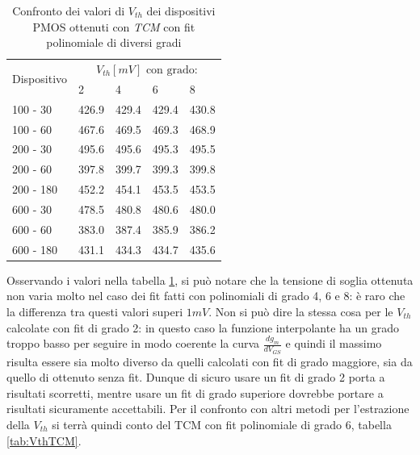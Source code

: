 \documentclass[12pt, letterpaper]{book}
\begin{document}
\begin{table}[h]
  \renewcommand{\arraystretch}{1.3}
  \centering
  \begin{tabular}{m{2cm} m{2cm} m{2cm} m{2cm} m{2cm}}
    \toprule
    \multirow{2}{*}{Dispositivo} & \multicolumn{4}{c}{$V_{th} [mV] \text{ con grado:}$}                         \\
    \cmidrule{2-5}
                                 & 2                                                    & 4     & 6     & 8     \\
    \midrule
    100 - 30                     & 426.9                                                & 429.4 & 429.4 & 430.8 \\
    \hline
    100 - 60                     & 467.6                                                & 469.5 & 469.3 & 468.9 \\
    \hline
    200 - 30                     & 495.6                                                & 495.6 & 495.3 & 495.5 \\
    \hline
    200 - 60                     & 397.8                                                & 399.7 & 399.3 & 399.8 \\
    \hline
    200 - 180                    & 452.2                                                & 454.1 & 453.5 & 453.5 \\
    \hline
    600 - 30                     & 478.5                                                & 480.8 & 480.6 & 480.0 \\
    \hline
    600 - 60                     & 383.0                                                & 387.4 & 385.9 & 386.2 \\
    \hline
    600 - 180                    & 431.1                                                & 434.3 & 434.7 & 435.6 \\
    \bottomrule
  \end{tabular}
  \caption{Confronto dei valori di $V_{th}$ dei dispositivi PMOS ottenuti con \emph{TCM} con fit polinomiale di diversi gradi}
  \label{tab:GradiTCM}
\end{table}

Osservando i valori nella tabella \ref{tab:GradiTCM}, si può notare che la tensione di soglia ottenuta non varia molto nel caso dei fit fatti con polinomiali di grado 4, 6 e 8: è raro che la differenza tra questi valori superi $1 mV$. Non si può dire la stessa cosa per le $V_{th}$ calcolate con fit di grado 2: in questo caso la funzione interpolante ha un grado troppo basso per seguire in modo coerente la curva $\frac{dg_m}{dV_{GS}}$ e quindi il massimo risulta essere sia molto diverso da quelli calcolati con fit di grado maggiore, sia da quello di ottenuto senza fit. Dunque di sicuro usare un fit di grado 2 porta a risultati scorretti, mentre usare un fit di grado superiore dovrebbe portare a risultati sicuramente accettabili. Per il confronto con altri metodi per l'estrazione della $V_{th}$ si terrà quindi conto del TCM con fit polinomiale di grado 6, tabella \ref{tab:VthTCM}.
\end{document}

